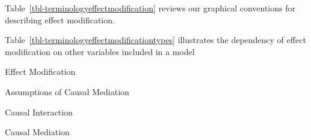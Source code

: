 \documentclass[
  single column]{article}
\begin{document}
Table~\ref{tbl-terminologyeffectmodification} reviews our graphical
conventions for describing effect modification.

\begin{table}

\caption{\label{tbl-terminologyeffectmodification}}

\centering{

\captionsetup{labelsep=none}

\terminologyeffectmodification

}

\end{table}%

Table~\ref{tbl-terminologyeffectmodificationtypes} illustrates the
dependency of effect modification on other variables included in a model

\begin{table}

\caption{\label{tbl-terminologyeffectmodificationtypes}Effect
Modification}

\centering{

\terminologyeffectmodificationtypes

}

\end{table}%

\newpage{}

\begin{table}

\caption{\label{tbl-swigtable}Assumptions of Causal Mediation}

\centering{

\swigtable

}

\end{table}%

\newpage{}

\begin{table}

\caption{\label{tbl-interactionpuzzle}Causal Interaction}

\centering{

\interactionpuzzle

}

\end{table}%

\newpage{}

\begin{table}

\caption{\label{tbl-medationpuzzle}Causal Mediation}

\centering{

\mediationpuzzle

}

\end{table}%
\end{document}

